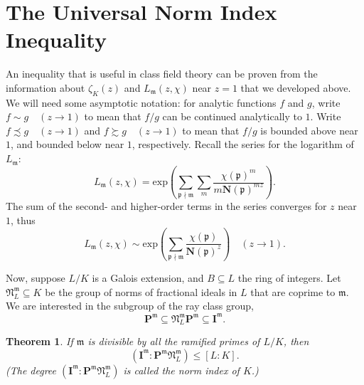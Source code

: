\documentclass{amsart}
\def\mf{\mathfrak}
\def\exp{\textrm{exp}}
\def\bI{\textbf{I}}
\def\bP{\textbf{P}}
\def\bN{\textbf{N}}
\newtheorem{theorem}{Theorem}[section]
\theoremstyle{definition}
\theoremstyle{remark}
\begin{document}
\section{The Universal Norm Index Inequality}

An inequality that is useful in class field theory can be proven
from the information about $\zeta_K(z)$ and $L_\mf{m}(z, \chi)$
near $z=1$ that we developed above. We will need some asymptotic
notation: for analytic functions $f$ and $g$, write $f \sim g
\quad (z \to 1)$ to mean that $f/g$ can be continued analytically
to $1$. Write $f \precsim g \quad (z \to 1)$ and $f \succsim g
\quad (z \to 1)$ to mean that $f/g$ is bounded above near $1$,
and bounded below near $1$, respectively.  Recall the series for
the logarithm of $L_\mf{m}$:
\[
L_\mf{m}(z, \chi) = \exp \left( \sum_{\mf{p} \nmid \mf{m}} \sum_m
\frac{\chi(\mf{p})^m}{m \bN(\mf{p})^{mz}} \right).
\]
The sum of the second- and higher-order terms in the series
converges for $z$ near $1$, thus
\[
L_\mf{m}(z, \chi) \sim \exp \left( \sum_{\mf{p} \nmid \mf{m}}
\frac{\chi(\mf{p})}{\bN(\mf{p})^z} \right) \quad (z \to 1).
\]

Now, suppose $L/K$ is a Galois extension, and $B \subseteq L$ the
ring of integers. Let $\mf{N}_L^\mf{m} \subseteq K$ be the group
of norms of fractional ideals in $L$ that are coprime to $\mf{m}$.
We are interested in the subgroup of the ray class group,
\[
\bP^\mf{m} \subseteq \mf{N}^\mf{m}_L \bP^\mf{m} \subseteq
\bI^\mf{m}.
\]
\begin{theorem}
If $\mf{m}$ is divisible by all the ramified primes of $L/K$, then
\[
(\bI^\mf{m} : \bP^\mf{m} \mf{N}^\mf{m}_L ) \leq [L : K].
\]
(The degree $(\bI^\mf{m} : \bP^\mf{m} \mf{N}^\mf{m}_L )$ is called
the norm index of $K$.)
\end{theorem}
\end{document}
